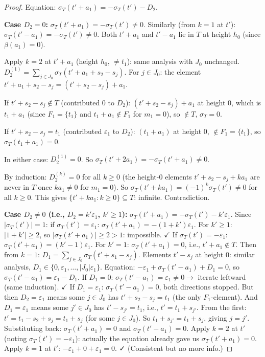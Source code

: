 \begin{proof}
Equation: $\sigma_T(t'+a_1) = -\sigma_T(t') - D_2$.

\textbf{Case $D_2 = 0$:} $\sigma_T(t'+a_1) = -\sigma_T(t') \neq 0$.
Similarly (from $k=1$ at $t'$): $\sigma_T(t'-a_1) = -\sigma_T(t') \neq 0$.
Both $t'+a_1$ and $t'-a_1$ lie in $T$ at height $h_0$ (since $\beta(a_1)=0$).

Apply $k=2$ at $t'+a_1$ (height $h_0$, $\neq t_1$): same analysis with $J_0$ unchanged.
$D_2^{(1)} = \sum_{j\in J_0}\sigma_T(t'+a_1+s_2-s_j)$.  For $j\in J_0$: the element
$t'+a_1+s_2-s_j = (t'+s_2-s_j)+a_1$.

If $t'+s_2-s_j \notin T$ (contributed $0$ to $D_2$): $(t'+s_2-s_j)+a_1$ at height $0$,
which is $t_1+a_1$ (since $F_1=\{t_1\}$ and $t_1+a_1 \notin F_1$ for $m_1=0$), so $\notin T$,
$\sigma_T=0$.

If $t'+s_2-s_j = t_1$ (contributed $\varepsilon_1$ to $D_2$): $(t_1+a_1)$ at height $0$,
$\notin F_1=\{t_1\}$, so $\sigma_T(t_1+a_1)=0$.

In either case: $D_2^{(1)} = 0$.  So $\sigma_T(t'+2a_1) = -\sigma_T(t'+a_1) \neq 0$.

By induction: $D_2^{(k)}=0$ for all $k \geq 0$ (the height-0 elements $t'+s_2-s_j+ka_1$
are never in $T$ once $ka_1 \neq 0$ for $m_1=0$).  So $\sigma_T(t'+ka_1)=(-1)^k\sigma_T(t')\neq 0$
for all $k \geq 0$.  This gives $\{t'+ka_1:k\geq 0\}\subseteq T$: infinite.  Contradiction.

\textbf{Case $D_2 \neq 0$ (i.e., $D_2 = k'\varepsilon_1$, $k' \geq 1$):}
$\sigma_T(t'+a_1) = -\sigma_T(t') - k'\varepsilon_1$.
Since $|\sigma_T(t')|=1$: if $\sigma_T(t')=\varepsilon_1$: $\sigma_T(t'+a_1) = -(1+k')\varepsilon_1$.
For $k' \geq 1$: $|1+k'| \geq 2$, so $|\sigma_T(t'+a_1)| \geq 2 > 1$: impossible. $\checkmark$
If $\sigma_T(t') = -\varepsilon_1$: $\sigma_T(t'+a_1)=(k'-1)\varepsilon_1$.
For $k'=1$: $\sigma_T(t'+a_1)=0$, i.e., $t'+a_1\notin T$.  Then from $k=1$:
$D_1=\sum_{j\in J_0}\sigma_T(t'+s_1-s_j)$.  Elements $t'-s_j$ at height $0$: similar analysis,
$D_1 \in \{0,\varepsilon_1,\ldots,|J_0|\varepsilon_1\}$.
Equation: $-\varepsilon_1+\sigma_T(t'-a_1)+D_1=0$, so $\sigma_T(t'-a_1)=\varepsilon_1-D_1$.
If $D_1=0$: $\sigma_T(t'-a_1)=\varepsilon_1\neq 0\rightarrow$ iterate leftward (same induction). $\checkmark$
If $D_1=\varepsilon_1$: $\sigma_T(t'-a_1)=0$, both directions stopped.
  But then $D_2=\varepsilon_1$ means some $j\in J_0$ has $t'+s_2-s_j=t_1$ (the only $F_1$-element).
  And $D_1=\varepsilon_1$ means some $j'\in J_0$ has $t'-s_{j'}=t_1$, i.e., $t'=t_1+s_{j'}$.
  From the first: $t'=t_1-s_2+s_j=t_1+s_j$ (for some $j\in J_0$).
  So $t_1+s_{j'}=t_1+s_j$, giving $j=j'$.
  Substituting back: $\sigma_T(t'+a_1)=0$ and $\sigma_T(t'-a_1)=0$.
  Apply $k=2$ at $t'$ (noting $\sigma_T(t')=-\varepsilon_1$):
  actually the equation already gave us $\sigma_T(t'+a_1)=0$.
  Apply $k=1$ at $t'$: $-\varepsilon_1+0+\varepsilon_1=0$. ✓ (Consistent but no more info.)


\end{proof}
